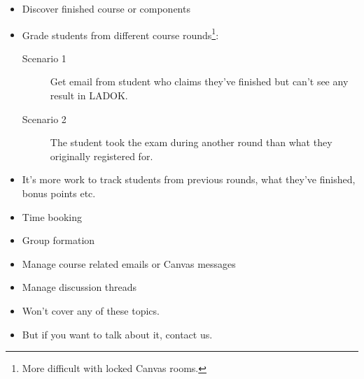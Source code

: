 \begin{frame}[fragile]\label<2>{WishLateStudents}
  \begin{example}
    \begin{itemize}
      \item \alert<2>{Discover finished course or components}
      \item \alert<2>{Grade students from different course rounds}\footnote{%
          More difficult with locked Canvas rooms.
        }:
        \begin{description}
          \item[Scenario 1] \alert<2>{Get email from student who claims they've 
            finished but can't see any result in LADOK.}

          \item[Scenario 2] The student took the exam during another round than 
            what they originally registered for.
        \end{description}

      \item \alert<2>{It's more work to track students from previous rounds, 
        what they've finished, bonus points etc.}
    \end{itemize}
  \end{example}
\end{frame}

\begin{frame}[fragile]
  \begin{example}
    \begin{itemize}
      \item Time booking
      \item Group formation
      \item Manage course related emails or Canvas messages
      \item Manage discussion threads
    \end{itemize}
  \end{example}

  \pause

  \begin{remark}
    \begin{itemize}
      \item Won't cover any of these topics.
      \item But if you want to talk about it, contact us.
    \end{itemize}
  \end{remark}
\end{frame}

